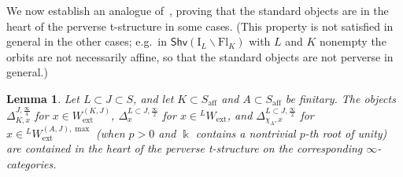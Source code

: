 \documentclass[11pt]{amsart}
\numberwithin{equation}{section}
\theoremstyle{plain}
\newtheorem{lem}[thm]{Lemma}
\theoremstyle{definition}
\newcommand{\I}{{\mathrm I}}
\renewcommand{\k}{\Bbbk}
\newcommand{\semi}{{{\frac{\infty}{2}}}}
\newcommand{\quar}{{{\frac{\infty}{4}}}}
\newcommand{\ex}{\mathrm{ext}}
\newcommand{\af}{\mathrm{aff}}
\newcommand{\Shv}{\mathsf{Shv}}
\newcommand{\Fl}{\mathrm{Fl}}
\begin{document}
We now establish an analogue of~\cite[Lem\-ma~6.9]{adr}, proving that the standard objects are in the heart of the perverse t-structure in some cases. (This property is not satisfied in general in the other cases; e.g.~in $\Shv(\I_L \backslash \Fl_K)$ with $L$ and $K$ nonempty the orbits are not necessarily affine, so that the standard objects are not perverse in general.)

\begin{lem}
\label{lem:standard-perverse}
Let $L\subset J\subset S$, and let $K\subset S_\af$ and $A \subset S_\af$ be finitary. 
The objects $\Delta^{J,\quar}_{K,x}$ for $x \in W_\ex^{(K,J)}$, $\Delta^{L\subset J,\semi}_{x}$ for $x \in {}^L W_\ex$, and $\Delta^{L\subset J,\semi}_{\chi_A,x}$ for $x \in {}^L W_\ex^{(A,J),\max}$ (when $p>0$ and $\k$ contains a nontrivial $p$-th root of unity) are contained in the heart of the perverse t-structure on the corresponding $\infty$-categories. 
\end{lem}
\end{document}
